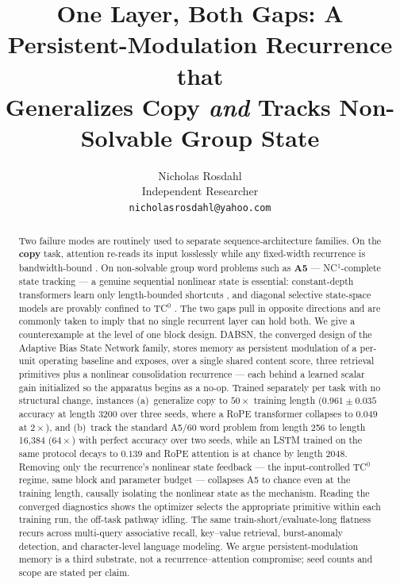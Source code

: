 \documentclass[11pt]{article}
\title{One Layer, Both Gaps: A Persistent-Modulation Recurrence that\\
Generalizes Copy \emph{and} Tracks Non-Solvable Group State}
\author{Nicholas Rosdahl\\
Independent Researcher\\
\texttt{nicholasrosdahl@yahoo.com}}
\date{}
\newcommand{\model}{DABSN}
\begin{document}
\maketitle

\begin{abstract}
Two failure modes are routinely used to separate sequence-architecture
families. On the \textbf{copy} task, attention re-reads its input losslessly
while any fixed-width recurrence is bandwidth-bound \citep{jelassi2024repeat}.
On non-solvable group word problems such as \textbf{A5} --- NC$^1$-complete state tracking
\citep{barrington1989bounded} --- a genuine sequential nonlinear state is
essential: constant-depth transformers learn only length-bounded shortcuts
\citep{liu2023transformers}, and diagonal selective state-space models are
provably confined to TC$^0$ \citep{merrill2024illusion}. The two gaps pull in
opposite directions and are commonly taken to imply that no single recurrent
layer can hold both. We give a counterexample at the level of one block
design. \model{}, the converged design of the Adaptive Bias State Network
family, stores memory as persistent modulation of a per-unit operating
baseline and exposes, over a single shared content score, three retrieval
primitives plus a nonlinear consolidation recurrence --- each behind a learned
scalar gain initialized so the apparatus begins as a no-op. Trained separately
per task with no structural change, instances
(a)~generalize copy to $50\times$ training length ($0.961 \pm 0.035$ accuracy
at length 3200 over three seeds, where a RoPE transformer collapses to
$0.049$ at $2\times$), and (b)~track the standard A5/60 word problem from
length 256 to length 16{,}384 ($64\times$) with perfect accuracy over two
seeds, while an LSTM trained on the same protocol decays to $0.139$ and RoPE
attention is at chance by length 2048. Removing only the recurrence's
nonlinear state feedback --- the input-controlled TC$^0$ regime, same block and
parameter budget --- collapses A5 to chance even at the training length,
causally isolating the nonlinear state as the mechanism. Reading the converged diagnostics shows the optimizer
selects the appropriate primitive within each training run, the off-task
pathway idling. The same train-short/evaluate-long flatness recurs across
multi-query associative recall, key--value retrieval, burst-anomaly detection,
and character-level language modeling. We argue persistent-modulation memory
is a third substrate, not a recurrence--attention compromise; seed counts and
scope are stated per claim.
\end{abstract}
\end{document}

